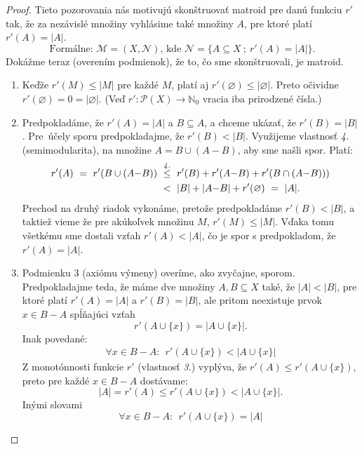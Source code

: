 \begin{proof}
	Tieto pozorovania nás motivujú skonštruovať matroid pre danú funkciu $r'$ tak, že za nezávislé množiny vyhlásime také množiny $A$, pre ktoré platí $r'(A) = |A|$.
	$$\text{Formálne: } \mathcal{M}=(X,\mathcal{N}) \text{, kde } \mathcal{N}=\{A\subseteq X ~;~ r'(A) = |A|\}.$$
	Dokážme teraz (overením podmienok), že to, čo sme skonštruovali, je matroid.
	\begin{enumerate}
		\item
		Keďže $r'(M) \le |M|$ pre každé $M$, platí aj $r'(\varnothing) \le |\varnothing|$. Preto očividne $r'(\varnothing) = 0 = |\varnothing|$. (Veď $r'\colon \mathcal{P}(X) \rightarrow \mathbb{N}_0$ vracia iba prirodzené čísla.)

		\item
		Predpokladáme, že $r'(A) = |A|$ a $B \subseteq A$, a chceme ukázať, že $r'(B) = |B|$. Pre~účely sporu predpokladajme, že $r'(B) < |B|$. Využijeme vlastnosť {\it 4.} (semimodularita), na množine $A=B\cup (A{-}B)$, aby sme našli spor. Platí:
		\begin{align*}
			r'(A) ~=~ r'(B \cup (A{-}B))	~&\overset{\it 4.}{\le}~ r'(B)+r'(A{-}B)+r'(B \cap (A{-}B)))		\\
							~&<~ |B| + |A{-}B| + r'(\varnothing) ~=~ |A|.
		\end{align*}
		Prechod na druhý riadok vykonáme, pretože predpokladáme $r'(B) < |B|$, a taktiež vieme že pre akúkoľvek množinu $M$, $r'(M) \le |M|$. Vďaka tomu všetkému sme dostali vzťah $r'(A) < |A|$, čo je spor s predpokladom, že $r'(A) = |A|$.

		\item
		Podmienku 3 (axiómu výmeny) overíme, ako zvyčajne, sporom. Predpokladajme teda, že máme dve množiny $A,B \subseteq X$ také, že $|A| < |B|$, pre ktoré platí $r'(A)=|A|$ a $r'(B)=|B|$, ale pritom neexistuje prvok $x\in B{-}A$ spĺňajúci vzťah
		$$r'(A \cup \{x\}) = |A \cup \{x\}|.$$
		Inak povedané:
		\begin{align*}
			\forall x \in B{-}A:~~ r'(A \cup \{x\}) < |A \cup \{x\}|
		\end{align*}
		Z monotónnosti funkcie $r'$ (vlastnosť {\it 3.}) vyplýva, že $r'(A) \le r'(A \cup \{x\})$, preto pre každé $x\in B-A$ dostávame:
		$$|A|=r'(A) \le r'(A \cup \{x\}) < |A \cup \{x\}|.$$
		Inými slovami
		\begin{equation}
			\forall x \in B{-}A:~~ r'(A \cup \{x\}) = |A|
		\label{predpoklad}
		\end{equation}


\end{enumerate}
\end{proof}
